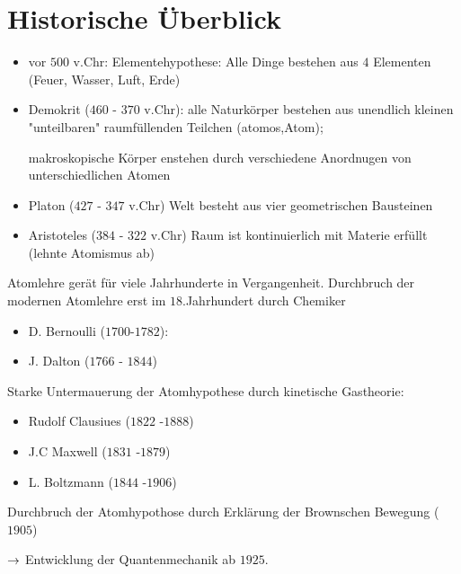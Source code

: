 \section{Historische Überblick} %
\label{sec:Historische_Überblick}
\begin{itemize}
    \item vor $500$ v.Chr: Elementehypothese: Alle Dinge bestehen aus $4$
    Elementen (Feuer, Wasser, Luft, Erde)
    \item Demokrit ($460$ - $370$ v.Chr): alle Naturkörper bestehen aus
    unendlich kleinen "unteilbaren" raumfüllenden Teilchen (atomos,Atom);

    makroskopische Körper enstehen durch verschiedene Anordnugen von
    unterschiedlichen Atomen
    \item Platon ($427$ - $347$ v.Chr)
    Welt besteht aus vier geometrischen Bausteinen
    \item Aristoteles ($384$ - $322$ v.Chr)
    Raum ist kontinuierlich mit Materie erfüllt (lehnte Atomismus ab)
\end{itemize}
    Atomlehre gerät für viele Jahrhunderte in Vergangenheit. Durchbruch
    der modernen Atomlehre erst im $18$.Jahrhundert durch Chemiker
\begin{itemize}
    \item D. Bernoulli ($1700$-$1782$):
    \item J. Dalton ($1766$ - $1844$)
\end{itemize}    
Starke Untermauerung der Atomhypothese durch kinetische Gastheorie:
\begin{itemize}
    \item Rudolf Clausiues ($1822$ -$1888$)
    \item J.C Maxwell ($1831$ -$1879$)
    \item L. Boltzmann ($1844$ -$1906$)
\end{itemize}
Durchbruch der Atomhypothose durch Erklärung der Brownschen Bewegung ($1905$) 

$\rightarrow$ Entwicklung der Quantenmechanik ab $1925$.

